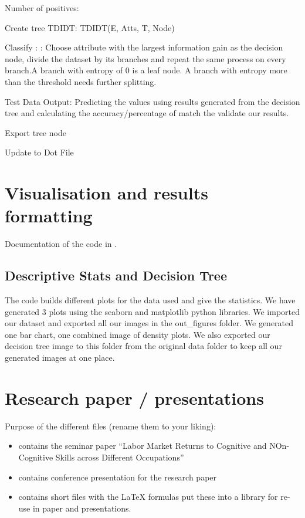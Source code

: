 \documentclass[a4paper,11pt,english]{sphinxmanual}
\begin{document}
Number of positives:

Create tree TDIDT: TDIDT(E, Atts, T, Node)

Classify : : Choose attribute with the largest information gain as the decision node, divide the dataset by its branches and repeat the same process on every branch.A branch with entropy of 0 is a leaf node. A branch with entropy more than the threshold needs further splitting.

Test Data Output: Predicting the values using results generated from the decision tree and calculating the accuracy/percentage of match the validate our results.

Export tree node

Update to Dot File


\chapter{Visualisation and results formatting}
\label{\detokenize{final:visualisation-and-results-formatting}}\label{\detokenize{final:final}}\label{\detokenize{final::doc}}
Documentation of the code in .


\section{Descriptive Stats and Decision Tree}
\label{\detokenize{final:descriptive-stats-and-decision-tree}}\label{\detokenize{final:module-src.final.Descriptive}}
The code builds different plots for the data used and give the statistics. We have generated 3 plots using the seaborn and matplotlib python libraries.
We imported our dataset and exported all our images in the out\_figures folder.
We generated one bar chart, one combined image of density plots. We also exported our decision tree image to this folder from the original data folder to keep all our generated images at one place.


\chapter{Research paper / presentations}
\label{\detokenize{paper:research-paper-presentations}}\label{\detokenize{paper:paper}}\label{\detokenize{paper::doc}}
Purpose of the different files (rename them to your liking):
\begin{itemize}
\item {} 
 contains the seminar paper “Labor Market Returns to Cognitive and NOn-Cognitive Skills across Different Occupations”

\item {} 
 contains conference presentation for the research paper

\item {} 
 contains short files with the LaTeX formulas \textendash{} put these into a library for re-use in paper and presentations.

\end{itemize}
\end{document}

